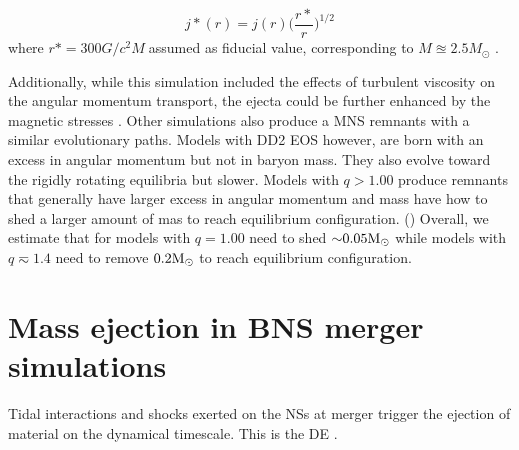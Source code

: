 \begin{equation*}
    j*(r) = j(r) \Big( \frac{r*}{r} \Big)^{1/2}
\end{equation*}
%
where $r* = 300 G/c^2M$assumed as fiducial value, corresponding
to $M \approxeq 2.5M_{\odot}$ \citep{Radice:2018xqa}.

Additionally, while this simulation included the effects of turbulent viscosity on the
angular momentum transport, the ejecta could be further enhanced by the magnetic stresses 
\citep{Metzger:2006mw,Bucciantini:2011kx,Siegel:2017nub,Fernandez:2018kax,Ciolfi:2020hgg}.
%
%
Other simulations also produce a \ac{MNS} remnants with a similar evolutionary paths. 
Models with DD2 \ac{EOS} however, are born with an excess in angular momentum but not in 
baryon mass. They also evolve toward the rigidly rotating equilibria but slower.
Models with $q>1.00$ produce remnants that generally have larger excess in angular momentum 
and mass have how to shed a larger amount of mas to reach equilibrium configuration.
()
Overall, we estimate that for models with $q=1.00$ need to shed ${\sim}0.05{\text{M}_{\odot}}$ while 
models with $q\eqsim 1.4$ need to remove $0.2{\text{M}_{\odot}}$ to reach equilibrium configuration.
















\section{Mass ejection in \ac{BNS} merger simulations}



Tidal interactions and shocks exerted on the \acp{NS} at merger 
trigger the ejection of material on the dynamical timescale. This is the \ac{DE} 
\citep[\eg][]{Hotokezaka:2013b,Bauswein:2013yna,Radice:2016dwd,Radice:2018pdn}. 



